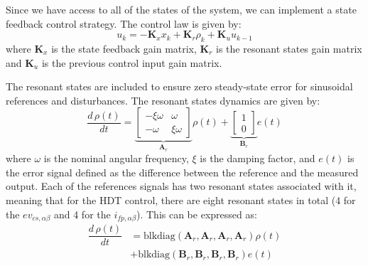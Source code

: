 Since we have access to all of the states of the system, we can implement a state feedback control strategy. The control law is given by:
\begin{equation}
    u_k = -\mathbf{K}_x x_k + \mathbf{K}_r \rho_k + \mathbf{K}_u u_{k - 1}
\end{equation}
where $\mathbf{K}_x$ is the state feedback gain matrix, $\mathbf{K}_r$ is the resonant states gain matrix and $\mathbf{K}_u$ is the previous control input gain matrix. 

The resonant states are included to ensure zero steady-state error for sinusoidal references and disturbances. The resonant states dynamics are given by:
\begin{equation}
    \dfrac{d\,\rho(t)}{dt} = 
    \underbrace{
    \begin{bmatrix}
        -\xi\omega & \omega \\
        -\omega & \xi\omega
    \end{bmatrix}
    }_{\mathbf{A}_r}
    \rho(t) + 
    \underbrace{
    \begin{bmatrix}
        1\\
        0
    \end{bmatrix}
    }_{\mathbf{B}_r}
    e(t)
\end{equation}
where $\omega$ is the nominal angular frequency, $\xi$ is the damping factor, and $e(t)$ is the error signal defined as the difference between the reference and the measured output. Each of the references signals has two resonant states associated with it, meaning that for the HDT control, there are eight resonant states in total (4 for the $ev_{cs,\alpha\beta}$ and 4 for the $i_{fp,\alpha\beta}$). This can be expressed as:
\begin{align}
    \dfrac{d\,\rho(t)}{dt} &= \text{blkdiag}(\mathbf{A}_r, \mathbf{A}_r, \mathbf{A}_r, \mathbf{A}_r)\rho(t)\\
    &+ \text{blkdiag}(\mathbf{B}_r, \mathbf{B}_r, \mathbf{B}_r, \mathbf{B}_r)e(t)
\end{align}

